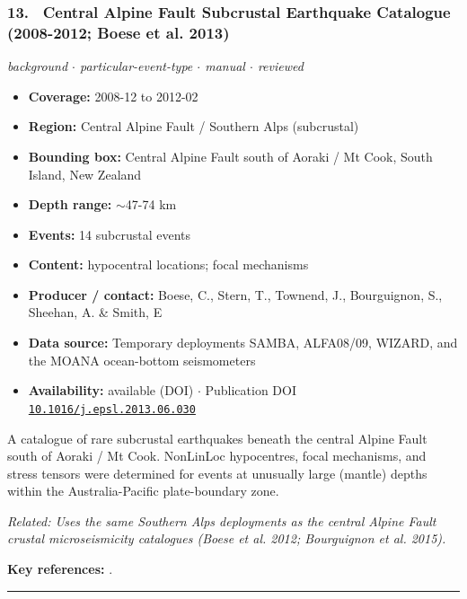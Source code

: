 \documentclass[10pt,a4paper]{article}
\newcommand{\catentryrule}{\par\vspace{3pt}\noindent\textcolor{rulegrey}{\rule{\linewidth}{0.3pt}}\par\vspace{5pt}}
\newcommand{\kv}[2]{\item \textbf{#1:} #2}
\begin{document}
\subsubsection*{\hypertarget{c:13}{13.}~ Central Alpine Fault Subcrustal Earthquake Catalogue (2008-2012; Boese et al. 2013)}
{\small\itshape background $\cdot$ particular-event-type $\cdot$ manual $\cdot$ reviewed}\par\vspace{2pt}
\begin{itemize}[leftmargin=1.3em,itemsep=0.6pt,topsep=1pt,parsep=0pt]
\kv{Coverage}{2008-12 to 2012-02}
\kv{Region}{Central Alpine Fault / Southern Alps (subcrustal)}
\kv{Bounding box}{Central Alpine Fault south of Aoraki / Mt Cook, South Island, New Zealand}
\kv{Depth range}{$\sim$47-74 km}
\kv{Events}{14 subcrustal events}
\kv{Content}{hypocentral locations; focal mechanisms}
\kv{Producer / contact}{Boese, C., Stern, T., Townend, J., Bourguignon, S., Sheehan, A. \& Smith, E}
\kv{Data source}{Temporary deployments SAMBA, ALFA08/09, WIZARD, and the MOANA ocean-bottom seismometers}
\kv{Availability}{available (DOI) $\cdot$ Publication DOI \href{https://doi.org/10.1016/j.epsl.2013.06.030}{\nolinkurl{10.1016/j.epsl.2013.06.030}}}
\end{itemize}
\par\vspace{2pt}A catalogue of rare subcrustal earthquakes beneath the central Alpine Fault south of Aoraki / Mt Cook. NonLinLoc hypocentres, focal mechanisms, and stress tensors were determined for events at unusually large (mantle) depths within the Australia-Pacific plate-boundary zone.
\par{\small\itshape Related: Uses the same Southern Alps deployments as the central Alpine Fault crustal microseismicity catalogues (Boese et al. 2012; Bourguignon et al. 2015).}
\par\vspace{2pt}\textbf{Key references:} \cite{Boese2013}.
\catentryrule
\end{document}
